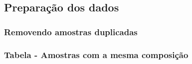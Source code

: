 \documentclass[]{article}
\newenvironment{Shaded}{\begin{snugshade}}{\end{snugshade}}
\newcommand{\CommentTok}[1]{\textcolor[rgb]{0.56,0.35,0.01}{\textit{#1}}}
\newcommand{\KeywordTok}[1]{\textcolor[rgb]{0.13,0.29,0.53}{\textbf{#1}}}
\newcommand{\NormalTok}[1]{#1}
\newcommand{\OperatorTok}[1]{\textcolor[rgb]{0.81,0.36,0.00}{\textbf{#1}}}
\newcommand{\StringTok}[1]{\textcolor[rgb]{0.31,0.60,0.02}{#1}}
\begin{document}
\hypertarget{preparauxe7uxe3o-dos-dados-1}{%
\subsection{Preparação dos dados}\label{preparauxe7uxe3o-dos-dados-1}}

\hypertarget{removendo-amostras-duplicadas}{%
\subsubsection{Removendo amostras
duplicadas}\label{removendo-amostras-duplicadas}}

\label{show-removing-duplicated-samples}

\begin{Shaded}
\end{Shaded}

\hypertarget{tabela---amostras-com-a-mesma-composiuxe7uxe3o}{%
\subsubsection{Tabela - Amostras com a mesma
composição}\label{tabela---amostras-com-a-mesma-composiuxe7uxe3o}}

\label{show-similar-samples}
\end{document}
